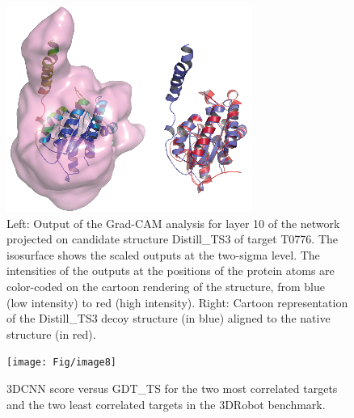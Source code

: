 \documentclass[letter,10pt]{article}
\begin{document}
\begin{figure}[H]
    \centerline{\includegraphics[width=0.8\linewidth]{Fig/FigT0776.eps}}
    \caption{Left: Output of the Grad-CAM analysis for layer 10 of
      the network projected on candidate structure Distill\_TS3 of
      target T0776. The isosurface shows the scaled outputs at the
      two-sigma level. The intensities of the outputs at the positions
      of the protein atoms are color-coded on the cartoon rendering of
      the structure, from blue (low intensity) to red (high
      intensity). Right: Cartoon representation of the Distill\_TS3
      decoy structure (in blue) aligned to the native structure (in
      red).}
    \label{Fig:GradCAMT0776}
\end{figure}





\begin{figure}[h]
    \centerline{\texttt{[image: Fig/image8]}}
    \caption{3DCNN score versus GDT\_TS for the two most correlated
      targets and the two least correlated targets in the 3DRobot
      benchmark.}
    \label{Fig:3DRobotBenchmark}
\end{figure}


{}

\end{document}
